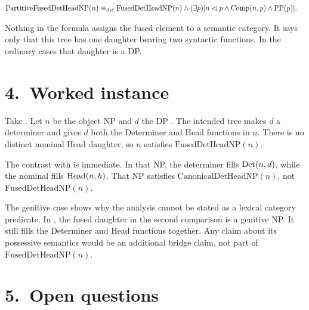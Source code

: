 \documentclass[11pt]{article}
\newcommand{\FusedDetHeadNP}{\mathrm{FusedDetHeadNP}}
\newcommand{\CanonicalDetHeadNP}{\mathrm{CanonicalDetHeadNP}}
\begin{document}
\ea\label{ex:partitive-fused}
$\begin{aligned}
\mathrm{PartitiveFusedDetHeadNP}(n) \defas {} & \FusedDetHeadNP(n) \wedge
  (\exists p)[n \imdom p \wedge \Cmp(n,p) \wedge \PP(p)].
\end{aligned}$\\
\z

Nothing in the formula assigns the fused element to a semantic category. It
says only that this tree has one daughter bearing two syntactic functions. In
the ordinary cases that daughter is a DP.

\section*{4.~Worked instance}

Take . Let $n$ be the object NP and $d$ the DP
. The intended tree makes $d$ a determiner and gives $d$ both
the Determiner and Head functions in $n$. There is no distinct nominal Head
daughter, so $n$ satisfies $\FusedDetHeadNP(n)$.

The contrast with  is immediate. In that NP, the
determiner  fills $\mathrm{Det}(n,d)$, while the nominal
 fills $\mathrm{Head}(n,h)$. That NP satisfies
$\CanonicalDetHeadNP(n)$, not $\FusedDetHeadNP(n)$.

The genitive case shows why the analysis cannot be stated as a lexical category
predicate. In , the fused
daughter in the second comparison is a genitive NP. It still fills the
Determiner and Head functions together. Any claim about its possessive
semantics would be an additional bridge claim, not part of
$\FusedDetHeadNP(n)$.

\section*{5.~Open questions}
\end{document}
